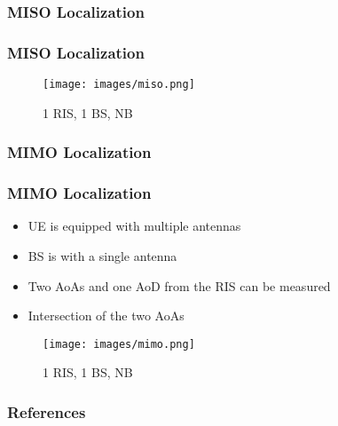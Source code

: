 \documentclass{beamer}
\let\olditem\item
\renewcommand\item{\olditem\justifying}
\begin{document}
\subsubsection{MISO Localization}
\begin{frame}
	\frametitle{MISO Localization}
	\begin{minipage}{.5\linewidth}
		
		
		
	\end{minipage}\hfill
	\begin{minipage}{.45\linewidth}
		\begin{figure}
			\centering
			\texttt{[image: images/miso.png]}
			\caption{1 RIS, 1 BS, NB}
			\label{fig:miso}
		\end{figure}
	\end{minipage}
\end{frame}


\subsubsection{MIMO Localization}
\begin{frame}
	\frametitle{MIMO Localization}
	\begin{minipage}{.5\linewidth}
		
		\begin{itemize}
			\item UE is equipped with multiple antennas
			\item BS is with a single antenna
			\item Two AoAs and one AoD from the RIS can be measured
			\item Intersection of the two AoAs
		\end{itemize}
		
	\end{minipage}\hfill
	\begin{minipage}{.45\linewidth}
		\begin{figure}
			\centering
			\texttt{[image: images/mimo.png]}
			\caption{1 RIS, 1 BS, NB}
			\label{fig:mimo}
		\end{figure}
	\end{minipage}
\end{frame}








\begin{frame}[allowframebreaks]
\frametitle{References}
    \printbibliography
\end{frame}

\end{document}
